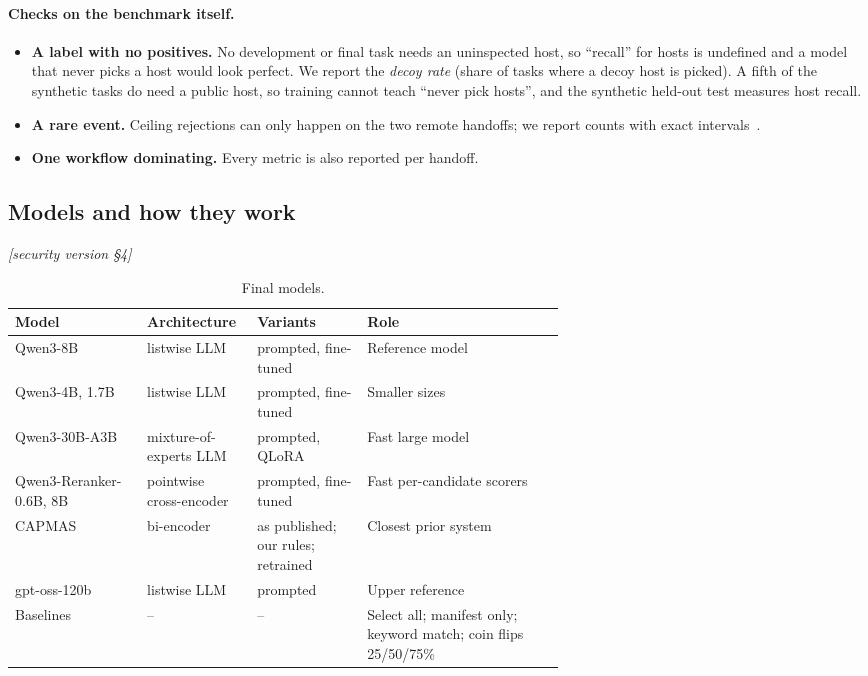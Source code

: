 \documentclass[10pt]{article}
\newcommand{\M}[1]{\textit{[security version #1]}}
\begin{document}
\paragraph{Checks on the benchmark itself.}
\begin{itemize}
  \item \textbf{A label with no positives.} No development or final task needs an uninspected host, so ``recall'' for hosts
    is undefined and a model that never picks a host would look perfect. We report the \emph{decoy rate} (share of tasks
    where a decoy host is picked). A fifth of the synthetic tasks do need a public host, so training cannot teach ``never
    pick hosts'', and the synthetic held-out test measures host recall.
  \item \textbf{A rare event.} Ceiling rejections can only happen on the two remote handoffs; we report counts with exact
    intervals~\cite{clopper}.
  \item \textbf{One workflow dominating.} Every metric is also reported per handoff.
\end{itemize}

\subsection{Models and how they work}\label{sec:models}
\M{\S4}

\begin{table}[H]\centering\small
\begin{tabularx}{\linewidth}{L{0.24\linewidth}L{0.2\linewidth}L{0.2\linewidth}Y}
\toprule
Model & Architecture & Variants & Role \\
\midrule
Qwen3-8B & listwise LLM & prompted, fine-tuned & Reference model \\
Qwen3-4B, 1.7B & listwise LLM & prompted, fine-tuned & Smaller sizes \\
Qwen3-30B-A3B & mixture-of-experts LLM & prompted, QLoRA & Fast large model \\
Qwen3-Reranker-0.6B, 8B & pointwise cross-encoder & prompted, fine-tuned & Fast per-candidate scorers \\
CAPMAS & bi-encoder & as published; our rules; retrained & Closest prior system \\
gpt-oss-120b & listwise LLM & prompted & Upper reference \\
Baselines & -- & -- & Select all; manifest only; keyword match; coin flips 25/50/75\% \\
\bottomrule
\end{tabularx}
\caption{Final models.}
\end{table}
\end{document}
